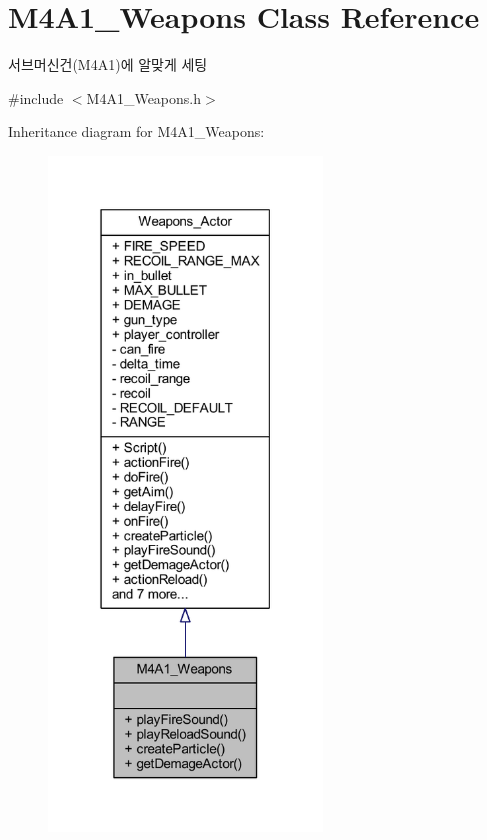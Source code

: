 \hypertarget{class_m4_a1___weapons}{}\section{M4\+A1\+\_\+\+Weapons Class Reference}
\label{class_m4_a1___weapons}


서브머신건(\+M4\+A1)에 알맞게 세팅  




{\ttfamily \#include $<$M4\+A1\+\_\+\+Weapons.\+h$>$}



Inheritance diagram for M4\+A1\+\_\+\+Weapons\+:\nopagebreak
\begin{figure}[H]
\begin{center}
\leavevmode
\includegraphics[width=206pt]{class_m4_a1___weapons__inherit__graph}
\end{center}
\end{figure}


